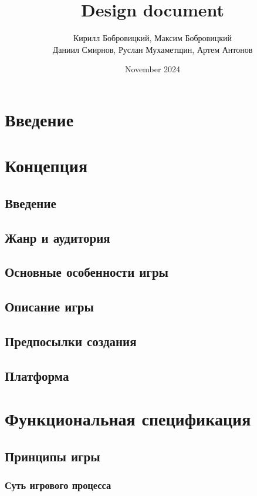 \documentclass{article}
\title{Design document}
\author{Кирилл Бобровицкий, Максим Бобровицкий\\
Даниил Смирнов, Руслан Мухаметщин, Артем Антонов}
\date{November 2024}
\begin{document}
\maketitle

\tableofcontents
\newpage

\section{Введение}


\newpage

\section{Концепция}
\subsection{Введение}

\subsection{Жанр и аудитория}


\subsection{Основные особенности игры}


\subsection{Описание игры}


\subsection{Предпосылки создания}


\subsection{Платформа}


\newpage

\section{Функциональная спецификация}
\subsection{Принципы игры}
\subsubsection{Суть игрового процесса}
\end{document}
